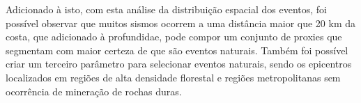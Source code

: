



\par{
    Adicionado à isto, com esta análise da distribuição espacial dos eventos, foi possível observar que muitos sismos ocorrem a uma distância maior que 20 km da costa, que adicionado à profundidae, pode compor um conjunto de proxies que segmentam com maior certeza de que são eventos naturais. Também foi possível criar um terceiro parâmetro para selecionar eventos naturais, sendo os epicentros localizados em regiões de alta densidade florestal e regiões metropolitanas sem ocorrência de mineração de rochas duras.
}




